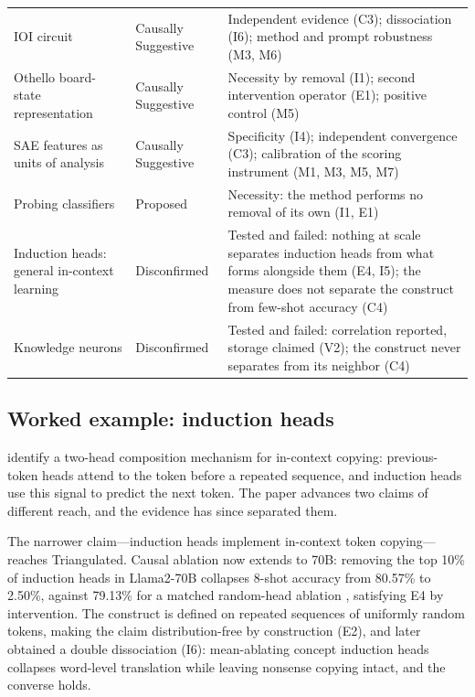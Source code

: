 \documentclass{article}
\begin{document}
\begin{table}[tbp]
\begin{tabular}{@{}>{\raggedright\arraybackslash}p{4.35cm}>{\raggedright\arraybackslash}p{2.6cm}>{\raggedright\arraybackslash}p{5.9cm}@{}}
IOI circuit \citep{wang2023interpretability} & Causally Suggestive & Independent evidence (C3); dissociation (I6); method and prompt robustness (M3, M6) \\
Othello board-state representation \citep{li2023othello} & Causally Suggestive & Necessity by removal (I1); second intervention operator (E1); positive control (M5) \\
SAE features as units of analysis \citep{cunningham2024sparse} & Causally Suggestive & Specificity (I4); independent convergence (C3); calibration of the scoring instrument (M1, M3, M5, M7) \\
\midrule
Probing classifiers \citep{belinkov2022probing} & Proposed & Necessity: the method performs no removal of its own (I1, E1) \\
\midrule
Induction heads: general in-context learning \citep{olsson2022context} & Disconfirmed & Tested and failed: nothing at scale separates induction heads from what forms alongside them (E4, I5); the measure does not separate the construct from few-shot accuracy (C4) \\
Knowledge neurons \citep{dai2022knowledge} & Disconfirmed & Tested and failed: correlation reported, storage claimed (V2); the construct never separates from its neighbor (C4) \\
\bottomrule
\end{tabular}
\end{table}
\endgroup

\subsection{Worked example: induction heads}
\label{sec:example-induction}

\citet{olsson2022context} identify a two-head composition mechanism for in-context copying: previous-token heads attend to the token before a repeated sequence, and induction heads use this signal to predict the next token. The paper advances two claims of different reach, and the evidence has since separated them.

The narrower claim---induction heads implement in-context token copying---reaches Triangulated. Causal ablation now extends to 70B: removing the top 10\% of induction heads in Llama2-70B collapses 8-shot accuracy from 80.57\% to 2.50\%, against 79.13\% for a matched random-head ablation \citep{yang2025unifying}, satisfying E4 by intervention. The construct is defined on repeated sequences of uniformly random tokens, making the claim distribution-free by construction (E2), and \citet{feucht2025dual} later obtained a double dissociation (I6): mean-ablating concept induction heads collapses word-level translation while leaving nonsense copying intact, and the converse holds.
\end{document}
